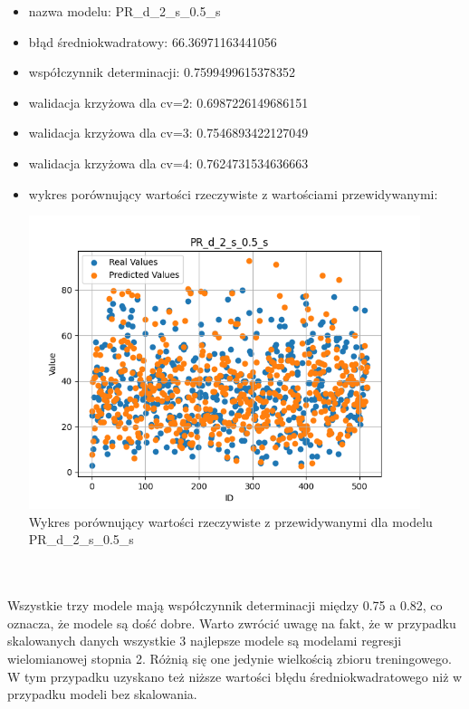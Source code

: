 \documentclass[11pt, a4paper, notitlepage]{report}
\begin{document}
\begin{itemize}
	\item nazwa modelu: PR\_d\_2\_s\_0.5\_s
	\item błąd średniokwadratowy: 66.36971163441056
	\item współczynnik determinacji: 0.7599499615378352
	\item walidacja krzyżowa dla cv=2: 0.6987226149686151
	\item walidacja krzyżowa dla cv=3: 0.7546893422127049
	\item walidacja krzyżowa dla cv=4: 0.7624731534636663
	\item wykres porównujący wartości rzeczywiste z wartościami przewidywanymi: \begin{center} \small
		\includegraphics[width=0.9\textwidth]{graphics/plots/PR_d_2_s_0.5_s.png} \\
		\caption{Wykres porównujący wartości rzeczywiste z przewidywanymi dla modelu PR\_d\_2\_s\_0.5\_s}
	\end{center}
\end{itemize}
\\ \\
Wszystkie trzy modele mają współczynnik determinacji między 0.75 a 0.82, co oznacza, że modele są dość dobre. Warto zwrócić uwagę na fakt, że w przypadku skalowanych danych wszystkie 3 najlepsze modele są modelami regresji wielomianowej stopnia 2.
Różnią się one jedynie wielkością zbioru treningowego. W tym przypadku uzyskano też niższe wartości błędu średniokwadratowego niż w przypadku modeli bez skalowania.
\end{document}
